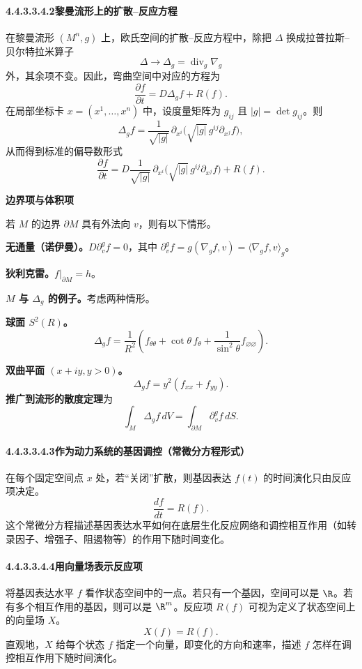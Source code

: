 \paragraph*{4.4.3.3.4.2\quad 黎曼流形上的扩散–反应方程}
在黎曼流形 $(M^n,g)$ 上，欧氏空间的扩散–反应方程中，除把 $\Delta$ 换成拉普拉斯–贝尔特拉米算子
\[
  \Delta\longrightarrow\Delta_g=\operatorname{div}_g\nabla_g
\]
外，其余项不变。因此，弯曲空间中对应的方程为
\[
  \frac{\partial f}{\partial t}=D\Delta_g f+R(f).
\]
在局部坐标卡 $x=(x^1,\ldots,x^n)$ 中，设度量矩阵为 $g_{ij}$ 且 $|g|=\det g_{ij}$。则
\[
  \Delta_g f=\frac{1}{\sqrt{|g|}}\,\partial_{x^i}
                    \bigl(\sqrt{|g|}\,g^{ij}\partial_{x^j}f\bigr),
\]
从而得到标准的偏导数形式
\[
  \frac{\partial f}{\partial t}
   =D\frac{1}{\sqrt{|g|}}\,\partial_{x^i}
                    \bigl(\sqrt{|g|}\,g^{ij}\partial_{x^j}f\bigr)+R(f).
\]

\textbf{边界项与体积项}

若 $M$ 的边界 $\partial M$ 具有外法向 $v$，则有以下情形。

\textbf{无通量（诺伊曼）。}$D\partial_v^gf=0$，其中
$\partial_v^gf=g(\nabla_g f,v)=\langle\nabla_g f,v\rangle_g$。

\textbf{狄利克雷。}$f|_{\partial M}=h$。

\textbf{$M$ 与 $\Delta_g$ 的例子。}考虑两种情形。

\textbf{球面 $S^2(R)$。}
\[
  \Delta_g f=\frac1{R^2}\left(f_{\theta\theta}+\cot\theta\,f_\theta
       +\frac1{\sin^2\theta}f_{\varnothing\varnothing}\right).
\]

\textbf{双曲平面 $(x+iy,y>0)$。}
\[
  \Delta_g f=y^2(f_{xx}+f_{yy}).
\]
\textbf{推广到流形的散度定理}为
\[
  \int_M\Delta_g f\,dV=\int_{\partial M}\partial_v^g f\,dS.
\]

\paragraph*{4.4.3.3.4.3\quad 作为动力系统的基因调控（常微分方程形式）}
在每个固定空间点 $x$ 处，若“关闭”扩散，则基因表达 $f(t)$ 的时间演化只由反应项决定。
\[
  \frac{df}{dt}=R(f).
\]
这个常微分方程描述基因表达水平如何在底层生化反应网络和调控相互作用（如转录因子、增强子、阻遏物等）的作用下随时间变化。

\paragraph*{4.4.3.3.4.4\quad 用向量场表示反应项}
将基因表达水平 $f$ 看作状态空间中的一点。若只有一个基因，空间可以是 $\R$。若有多个相互作用的基因，则可以是 $\R^m$。反应项 $R(f)$ 可视为定义了状态空间上的向量场 $X$。
\[
  X(f)=R(f).
\]
直观地，$X$ 给每个状态 $f$ 指定一个向量，即变化的方向和速率，描述 $f$ 怎样在调控相互作用下随时间演化。

